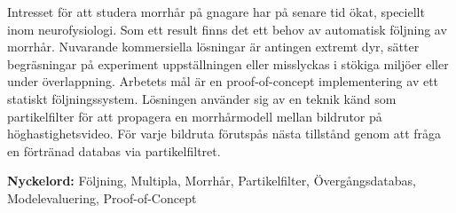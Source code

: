
Intresset för att studera morrhår på gnagare har på senare tid ökat, speciellt inom neurofysiologi.
Som ett result finns det ett behov av automatisk följning av morrhår.
Nuvarande kommersiella lösningar är antingen extremt dyr, sätter begräsningar på experiment uppställningen
eller misslyckas i stökiga miljöer eller under överlappning.
Arbetets mål är en proof-of-concept implementering av ett statiskt följningssystem. Lösningen använder sig av 
en teknik känd som partikelfilter för att propagera en morrhårmodell mellan bildrutor på höghastighetsvideo.
För varje bildruta förutspås nästa tillstånd genom att fråga en förtränad databas via partikelfiltret.

\textbf{Nyckelord:} Följning, Multipla, Morrhår, Partikelfilter, Övergångsdatabas, Modelevaluering, Proof-of-Concept

